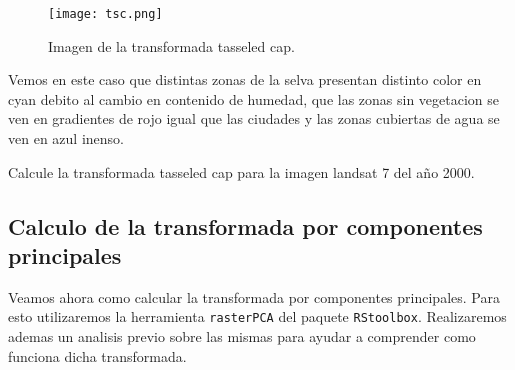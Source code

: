 \begin{exa}
    \begin{figure}
    \begin{center}
        \texttt{[image: tsc.png]}
    \end{center}
    \caption{Imagen de la transformada tasseled cap.}
    \label{fig:tsc}
    \end{figure}
    Vemos en este caso que distintas zonas de la selva presentan distinto color
    en cyan debito al cambio en contenido de humedad, que las zonas sin
    vegetacion se ven en gradientes de rojo igual que las ciudades y las zonas
    cubiertas de agua se ven en azul inenso.
\end{exa}

\begin{act}
    Calcule la transformada tasseled cap para la imagen landsat 7 del año 2000.
\end{act}

\subsection{Calculo de la transformada por componentes principales}

Veamos ahora como calcular la transformada por componentes principales. Para
esto utilizaremos la herramienta \texttt{rasterPCA} del paquete
\texttt{RStoolbox}. Realizaremos ademas un analisis previo sobre las mismas para
ayudar a comprender como funciona dicha transformada.

